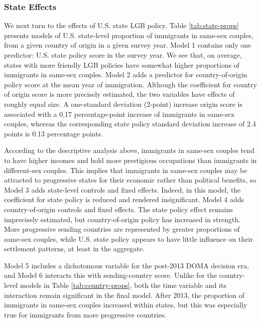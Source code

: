 \documentclass[
  11pt,
]{article}
\begin{document}
\hypertarget{state-effects}{%
\subsubsection{State Effects}\label{state-effects}}

We next turn to the effects of U.S. state LGB policy. Table \ref{tab:state-props} presents models of U.S. state-level proportion of immigrants in same-sex couples, from a given country of origin in a given survey year. Model 1 contains only one predictor: U.S. state policy score in the survey year. We see that, on average, states with more friendly LGB policies have somewhat higher proportions of immigrants in same-sex couples. Model 2 adds a predictor for country-of-origin policy score at the mean year of immigration. Although the coefficient for country of origin score is more precisely estimated, the two variables have effects of roughly equal size. A one-standard deviation (2-point) increase origin score is associated with a 0.17 percentage-point increase of immigrants in same-sex couples, whereas the corresponding state policy standard deviation increase of 2.4 points is 0.13 percentage points.

According to the descriptive analysis above, immigrants in same-sex couples tend to have higher incomes and hold more prestigious occupations than immigrants in different-sex couples. This implies that immigrants in same-sex couples may be attracted to progressive states for their economic rather than political benefits, so Model 3 adds state-level controls and fixed effects. Indeed, in this model, the coefficient for state policy is reduced and rendered insignificant. Model 4 adds country-of-origin controls and fixed effects. The state policy effect remains imprecisely estimated, but country-of-origin policy has increased in strength. More progressive sending countries are represented by greater proportions of same-sex couples, while U.S. state policy appears to have little influence on their settlement patterns, at least in the aggregate.

Model 5 includes a dichotomous variable for the post-2013 DOMA decision era, and Model 6 interacts this with sending-country score. Unlike for the country-level models in Table \ref{tab:country-props}, both the time variable and its interaction remain significant in the final model. After 2013, the proportion of immigrants in same-sex couples increased within states, but this was especially true for immigrants from more progressive countries.
\end{document}
